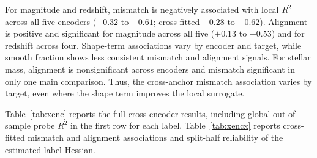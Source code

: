 \documentclass{article}
\begin{document}
For magnitude and redshift, mismatch is
negatively associated with local $R^2$
across all five encoders ($-0.32$ to $-0.61$;
cross-fitted $-0.28$ to $-0.62$).
Alignment is positive and significant for
magnitude across all five ($+0.13$ to $+0.53$)
and for redshift across four.
Shape-term associations vary by encoder and
target, while smooth fraction shows less
consistent mismatch and alignment signals.
For stellar mass, alignment is nonsignificant
across encoders and mismatch significant in
only one main comparison. Thus, the
cross-anchor mismatch association varies by
target, even where the shape term improves
the local surrogate.

Table~\ref{tab:xenc} reports the full
cross-encoder results, including global
out-of-sample probe $R^2$ in the first row
for each label. Table~\ref{tab:xencx}
reports cross-fitted mismatch and alignment
associations and split-half reliability of
the estimated label Hessian.
\end{document}
